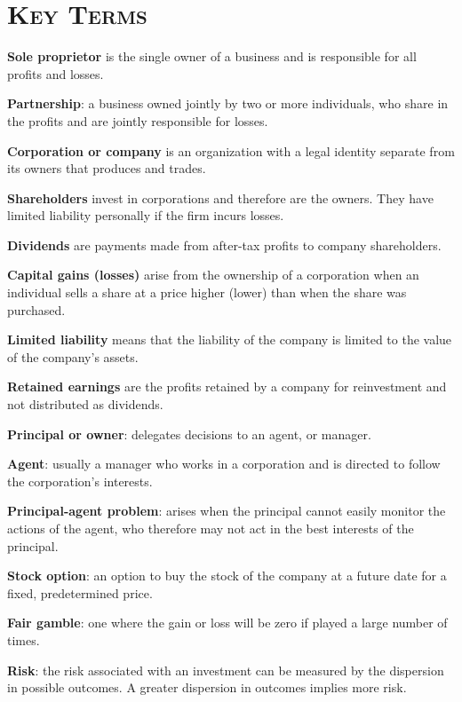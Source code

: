 \newpage
{}
	\section*{\textsc{Key Terms}}
\begin{keyterms}
\textbf{Sole proprietor} is the single owner of a business and is responsible for all profits and losses.

\textbf{Partnership}: a business owned jointly by two or more individuals, who share in the profits and are jointly responsible for losses.

\textbf{Corporation or company} is an organization with a legal identity separate from its owners that produces and trades.

\textbf{Shareholders} invest in corporations and therefore are the owners. They have limited liability personally if the firm incurs losses.

\textbf{Dividends} are payments made from after-tax profits to company shareholders.

\textbf{Capital gains (losses)} arise from the ownership of a corporation when an individual sells a share at a price higher (lower) than when the share was purchased.

\textbf{Limited liability} means that the liability of the company is limited to the value of the company's assets.

\textbf{Retained earnings} are the profits retained by a company for reinvestment and not distributed as dividends.

\textbf{Principal or owner}: delegates decisions to an agent, or manager.

\textbf{Agent}: usually a manager who works in a corporation and is directed to follow the corporation's interests.

\textbf{Principal-agent problem}: arises when the principal cannot easily monitor the actions of the agent, who therefore may not act in the best interests of the principal.

\textbf{Stock option}: an option to buy the stock of the company at a future date for a fixed, predetermined price.

\textbf{Fair gamble}: one where the gain or loss will be zero if played a large number of times.

\textbf{Risk}: the risk associated with an investment can be measured by the dispersion in possible outcomes. A greater dispersion in outcomes implies more risk.


\end{keyterms}
